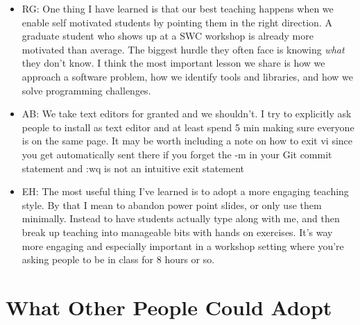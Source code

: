 \documentclass{article}
\begin{document}
\begin{itemize}
  \item RG: One thing I have learned is that our best teaching happens
    when we enable self motivated students by pointing them in the
    right direction. A graduate student who shows up at a SWC workshop
    is already more motivated than average. The biggest hurdle they
    often face is knowing \emph{what} they don't know. I think the
    most important lesson we share is how we approach a software
    problem, how we identify tools and libraries, and how we solve
    programming challenges.

  \item AB: We take text editors for granted and we shouldn't. I try
    to explicitly ask people to install as text editor and at least
    spend 5 min making sure everyone is on the same page. It may be
    worth including a note on how to exit vi since you get
    automatically sent there if you forget the -m in your Git commit
    statement and :wq is not an intuitive exit statement

  \item EH: The most useful thing I've learned is to adopt a more
    engaging teaching style.  By that I mean to abandon power point
    slides, or only use them minimally.  Instead to have students
    actually type along with me, and then break up teaching into
    manageable bits with hands on exercises.  It's way more engaging
    and especially important in a workshop setting where you're asking
    people to be in class for 8 hours or so.

\end{itemize}

\section{What Other People Could Adopt}
\end{document}
